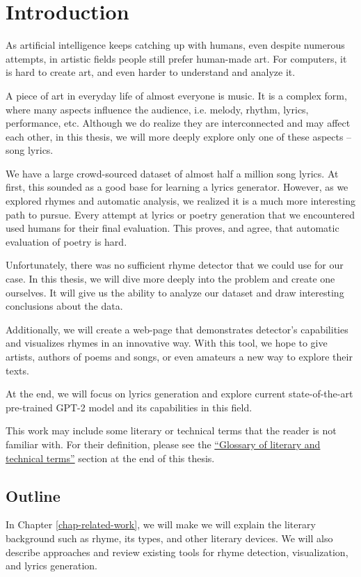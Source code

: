 \chapter*{Introduction}

As artificial intelligence keeps catching up with humans, even despite numerous attempts, in artistic fields people still prefer human-made art.
For computers, it is hard to create art, and even harder to understand and analyze it.

A piece of art in everyday life of almost everyone is music. It is a complex form, where many aspects influence the audience, i.e. melody, rhythm, lyrics, performance, etc. Although we do realize they are interconnected and may affect each other, in this thesis, we will more deeply explore only one of these aspects -- song lyrics. 

We have a large crowd-sourced dataset of almost half a million song lyrics. At first, this sounded as a good base for learning a lyrics generator. However, as we explored rhymes and automatic analysis, we realized it is a much more interesting path to pursue. Every attempt at lyrics or poetry generation that we encountered used humans for their final evaluation. This proves, and \cite{greene2010automatic} agree, that automatic evaluation of poetry is hard.

Unfortunately, there was no sufficient rhyme detector that we could use for our case. In this thesis, we will dive more deeply into the problem and create one ourselves. It will give us the ability to analyze our dataset and draw interesting conclusions about the data. 

Additionally, we will create a web-page that demonstrates detector's capabilities and visualizes rhymes in an innovative way. With this tool, we hope to give artists, authors of poems and songs, or even amateurs a new way to explore their texts.

At the end, we will focus on lyrics generation and explore current state-of-the-art
pre-trained GPT-2 model and its capabilities in this field.

This work may include some literary or technical terms that the reader is not familiar with. For their definition, please see the \hyperref[glossary-section]{``Glossary of literary and technical terms''} section at the end of this thesis.


\section*{Outline}
In Chapter \ref{chap-related-work}, we will make we will explain the literary background such as rhyme, its types, and other literary devices. We will also describe approaches and review existing tools for rhyme detection, visualization, and lyrics generation. 

